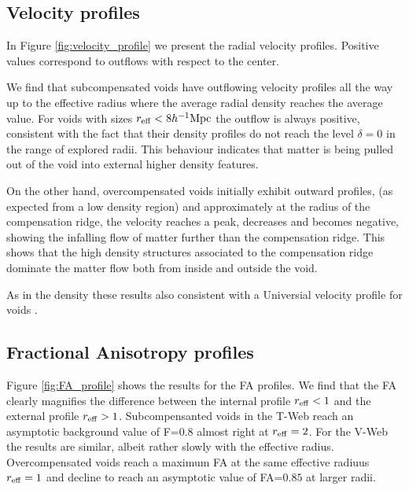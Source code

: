 \documentclass[a4,useAMS,usenatbib,usegraphicx]{mn2e}
\newcommand{\hMpc}{{\ifmmode{h^{-1}{\rm Mpc}}\else{$h^{-1}$Mpc}\fi}}
\begin{document}
\subsection{Velocity profiles}
\label{subsec:velocity_voids}

In Figure \ref{fig:velocity_profile} we present the radial velocity
profiles. 
Positive values correspond to outflows with respect to the center. 

We find that subcompensated voids have outflowing velocity profiles
all the way up to the effective radius where the average radial
density reaches the average value.
For voids with sizes $r_{\rm eff}<8\hMpc$ the outflow is always
positive, consistent with the fact that their density profiles do not
reach the level $\delta=0$ in the range of explored radii.
This behaviour indicates that matter is being pulled out of the void
into external higher density features.


On the other hand, overcompensated voids initially exhibit outward
profiles, (as expected from a low density region) and approximately at
the radius of the compensation ridge, the velocity reaches a peak,
decreases and becomes negative, showing the infalling flow of matter
further than the compensation ridge. 
This shows that the high density structures associated to the
compensation ridge dominate the matter flow both from inside and
outside the void.

As in the density these results also consistent with a Universial
velocity profile for voids \citep{Hamaus14}.

\subsection{Fractional Anisotropy profiles}
\label{subsec:FA_voids}



Figure \ref{fig:FA_profile} shows the results for the FA profiles.
We find that the FA clearly magnifies the difference between the
internal profile $r_{\rm eff}<1$ and the external profile $r_{\rm
  eff}>1$. 
Subcompensanted voids in the T-Web reach an asymptotic background
value of F=$0.8$ almost right at $r_{\rm eff}=2$. 
For the V-Web the results are similar, albeit rather slowly with the
effective radius.
Overcompensated voids reach a maximum FA at the same effective radiuus
$r_{\rm eff}=1$ and decline to reach an asymptotic value of FA=$0.85$
at larger radii.
\end{document}
